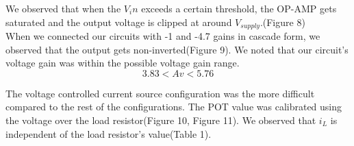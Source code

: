 \documentclass{article}
\begin{document}
We observed that when the $V_in$ exceeds a certain threshold, the OP-AMP gets saturated and the output voltage is clipped at around $V_{supply}$.(Figure 8)\\

When we connected our circuits with -1 and -4.7 gains in cascade form, we observed that the output gets non-inverted(Figure 9). We noted that our circuit's voltage gain was within the possible voltage gain range.
\[3.83 < Av < 5.76\]

The voltage controlled current source configuration was the more difficult compared to the rest of the configurations. The POT value was calibrated using the voltage over the load resistor(Figure 10, Figure 11). We observed that $i_L$ is independent of the load resistor's value(Table 1).
\end{document}
